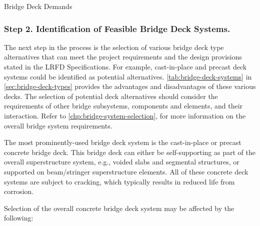 \begin{table}
  \caption{Bridge Deck Demands}\label{tab:bridge-deck-demands}
\end{table}

\subsubsection*{Step 2. Identification of Feasible Bridge Deck Systems.}
The next step in the process is the selection of various bridge deck type alternatives that can meet the project requirements and the design provisions stated in the LRFD Specifications. For example, cast-in-place and precast deck systems could be identified as potential alternatives. \cref{tab:bridge-deck-systems} in \cref{sec:bridge-deck-types} provides the advantages and disadvantages of these various decks. The selection of potential deck alternatives should consider the requirements of other bridge subsystems, components and elements, and their interaction. Refer to \cref{chp:bridge-system-selection}, for more information on the overall bridge system requirements.

The most prominently-used bridge deck system is the cast-in-place or precast concrete bridge deck. This bridge deck can either be self-supporting as part of the overall superstructure system, e.g., voided slabs and segmental structures, or supported on beam/stringer superstructure elements. All of these concrete deck systems are subject to cracking, which typically results in reduced life from corrosion.

Selection of the overall concrete bridge deck system may be affected by the following:

